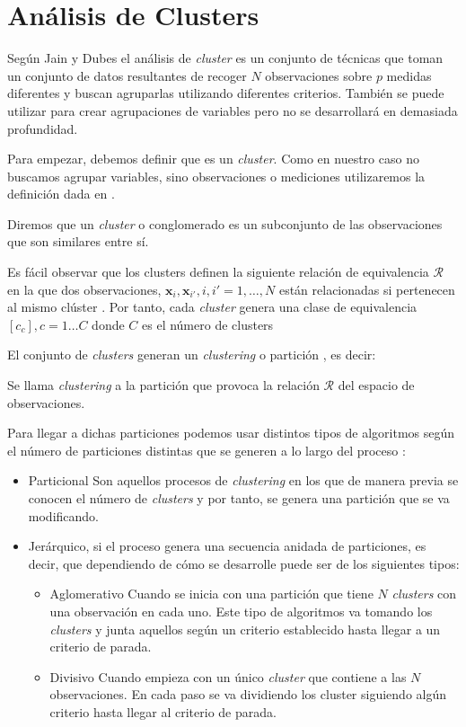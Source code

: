 \section{Análisis de Clusters}

\noindent Según Jain y Dubes  el análisis de \emph{cluster} es un conjunto de técnicas que toman un conjunto de datos resultantes de recoger $N$ observaciones sobre $p$ medidas diferentes y buscan agruparlas utilizando diferentes criterios. También se puede utilizar para crear agrupaciones de variables pero no se desarrollará en demasiada profundidad. 

\noindent Para empezar, debemos definir que es un \emph{cluster}. Como en nuestro caso no buscamos agrupar variables, sino observaciones o mediciones utilizaremos la definición dada en \cite{Everitt 2011}.
\begin{defi}
Diremos que un \emph{cluster} o conglomerado es un subconjunto de las observaciones que son similares entre sí. 
\end{defi}

\noindent Es fácil observar que los clusters definen la siguiente relación de equivalencia $\mathcal{R}$ en la que dos observaciones, $\mathbf{x}_i,\mathbf{x}_{i'}, i,i'=1, \ldots, N$ están relacionadas si pertenecen al mismo clúster \cite{Cuadras 2014}. Por tanto, cada \emph{cluster} genera una clase de equivalencia $[c_c], c=1\ldots C$ donde $C$ es el número de clusters

\noindent El conjunto de \emph{clusters} generan un \emph{clustering} o partición , es decir:
\begin{defi}
Se llama \textit{clustering} a la partición que provoca la relación $\mathcal{R}$ del espacio de observaciones. 
\end{defi}

\noindent Para llegar a dichas particiones podemos usar distintos tipos de algoritmos según el número de particiones distintas que se generen a lo largo del proceso \cite{Jain 1988}:
\begin{itemize}
\item Particional Son aquellos procesos de \emph{clustering} en los que de manera previa se conocen el número de \emph{clusters} y por tanto, se genera una partición que se va modificando.
\item Jerárquico, si el proceso genera una secuencia anidada de particiones, es decir, que dependiendo de cómo se desarrolle puede ser de los siguientes tipos:
\begin{itemize}
\item Aglomerativo Cuando se inicia con una partición que tiene $N$ \emph{clusters} con una observación en cada uno. Este tipo de algoritmos va tomando los \emph{clusters} y junta aquellos según un criterio establecido hasta llegar a un criterio de parada. 
\item Divisivo Cuando empieza con un único \emph{cluster} que contiene a las $N$ observaciones. En cada paso se va dividiendo los cluster siguiendo algún criterio hasta llegar al criterio de parada. 
\end{itemize}
\end{itemize}

